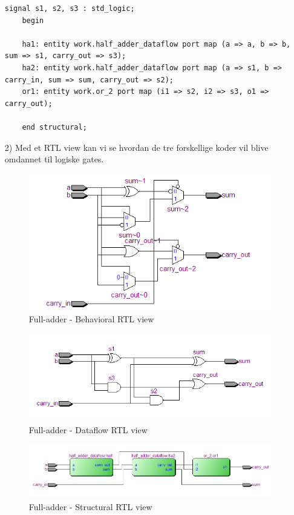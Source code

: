 \begin{enumerate}
\begin{lstlisting}[caption={Full-adder Structural VHDL kode},label={lst:FaStructuralCode}]
	signal s1, s2, s3 : std_logic;
	begin
	
	ha1: entity work.half_adder_dataflow port map (a => a, b => b, sum => s1, carry_out => s3);
	ha2: entity work.half_adder_dataflow port map (a => s1, b => carry_in, sum => sum, carry_out => s2);
	or1: entity work.or_2 port map (i1 => s2, i2 => s3, o1 => carry_out);
	
	end structural;
	\end{lstlisting}
	\newpage
	\flushleft
		\item[2)]
		Med et RTL view kan vi se hvordan de tre forskellige koder vil blive omdannet til logiske gates.\\
		\begin{figure}[h]
		\centering
		\includegraphics[scale=0.7]{pictures/Oevelse1/Full_adder/Behavioral_RTL.JPG}
		\caption{Full-adder - Behavioral RTL view}
		\label{fig:FaBehavioralRTL}
	\end{figure}
	
	\begin{figure}[h]
		\centering
		\includegraphics[scale=0.7]{pictures/Oevelse1/Full_adder/dataflow_RTL.JPG}
		\caption{Full-adder - Dataflow RTL view}
		\label{fig:FaDataflowRTL}	
	\end{figure}
	
	\begin{figure}[h]
		\centering
		\includegraphics[scale=0.7]{pictures/Oevelse1/Full_adder/Structural_RTL.JPG}
		\caption{Full-adder - Structural RTL view}
		\label{fig:FaStructuralRTL}	
	\end{figure}
	

\end{enumerate}
